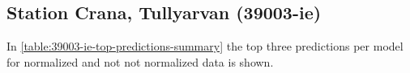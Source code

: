 \subsection{Station Crana, Tullyarvan (39003-ie)}
In \autoref{table:39003-ie-top-predictions-summary} the top three predictions per model for normalized and not not normalized data is shown.


